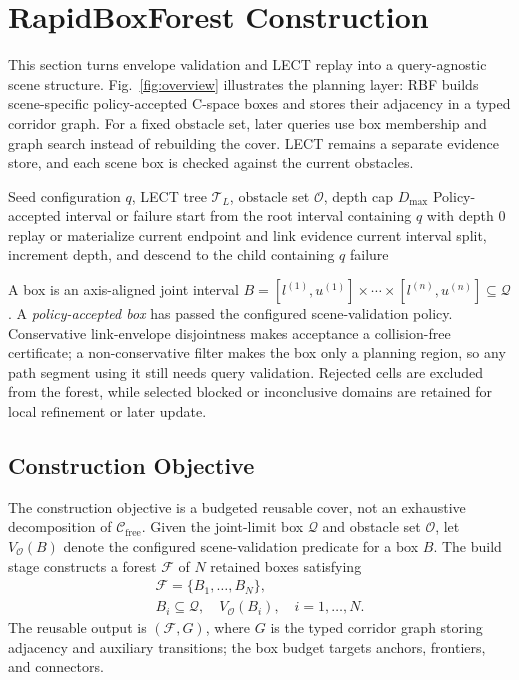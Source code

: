 \documentclass[journal]{IEEEtran}
\DeclareRobustCommand{\textsc}[1]{\textnormal{\MakeUppercase{#1}}}
\newcommand{\rbf}{\textsc{RBF}}
\newcommand{\Cfree}{\ensuremath{\mathcal{C}_{\mathrm{free}}}}
\newcommand{\calO}{\ensuremath{\mathcal{O}}}
\newcommand{\Q}{\ensuremath{\mathcal{Q}}}
\newcommand{\cspace}{\mbox{C-space}}
\begin{document}
\section{RapidBoxForest Construction}\label{sec:forest}

This section turns envelope validation and LECT replay into a query-agnostic
scene structure. Fig.~\ref{fig:overview} illustrates the planning layer:
\rbf{} builds scene-specific policy-accepted \cspace{} boxes and stores their
adjacency in a typed corridor graph. For a fixed obstacle set, later queries use
box membership and graph search instead of rebuilding the cover. LECT remains a
separate evidence store, and each scene box is checked against the current
obstacles.

\begin{algorithm}[t]
\caption{Local box materialization around a seed.}
\label{alg:ffb_rewrite}
\footnotesize
\begin{algorithmic}[1]
\REQUIRE Seed configuration $q$, LECT tree $\mathcal{T}_L$, obstacle set $\calO$,
depth cap $D_{\max}$
\ENSURE Policy-accepted interval or failure
\STATE start from the root interval containing $q$ with depth $0$
  \STATE replay or materialize current endpoint and link evidence
    \RETURN current interval
  \ENDIF
  \STATE split, increment depth, and descend to the child containing $q$
\ENDWHILE
\RETURN failure
\end{algorithmic}
\end{algorithm}

A box is an axis-aligned joint interval
$B=[l^{(1)},u^{(1)}]\times\cdots\times[l^{(n)},u^{(n)}]\subseteq\Q$.
A \emph{policy-accepted box} has passed the configured scene-validation policy.
Conservative link-envelope disjointness makes acceptance a collision-free
certificate; a non-conservative filter makes the box only a planning region, so
any path segment using it still needs query validation. Rejected cells are
excluded from the forest, while selected blocked or inconclusive domains are
retained for local refinement or later update.

\subsection{Construction Objective}\label{sec:forest_objective}

The construction objective is a budgeted reusable cover, not an exhaustive
decomposition of \(\Cfree\). Given the joint-limit box $\Q$ and obstacle set
$\calO$, let \(V_{\calO}(B)\) denote the configured scene-validation predicate
for a box \(B\). The build stage constructs a forest \(\mathcal{F}\)
of \(N\) retained boxes satisfying
\[
\begin{gathered}
\mathcal{F}=\{B_1,\ldots,B_N\},\\
B_i\subseteq\Q,\quad V_{\calO}(B_i),\quad i=1,\ldots,N.
\end{gathered}
\]
The reusable output is $(\mathcal{F},G)$, where \(G\) is the typed corridor
graph storing adjacency and auxiliary transitions; the box budget targets
anchors, frontiers, and connectors.
\end{document}

